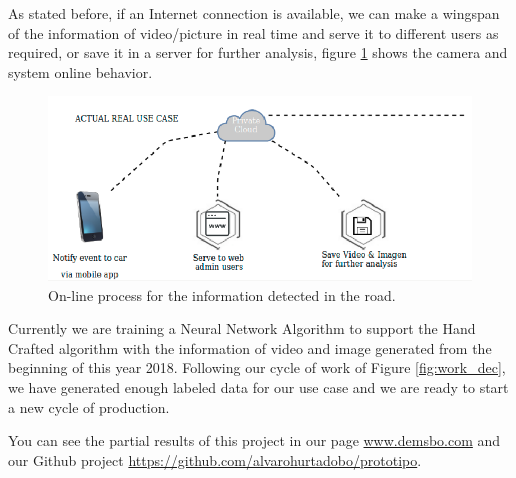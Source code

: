 As stated before, if an Internet connection is available, we can make a wingspan of the information of video/picture in real time and serve it to different users as required, or save it in a server for further analysis, figure \ref{fig:online} shows the camera and system online behavior.


\begin{figure}[t]\centering
	\includegraphics[width=\linewidth]{images/online}
	\caption{On-line process for the information detected in the road. }
	\label{fig:online}
\end{figure}

Currently we are training a Neural Network Algorithm to support the Hand Crafted algorithm with the information of video and image generated from the beginning of this year 2018. Following our cycle of work of Figure \ref{fig:work_dec}, we have generated enough labeled data for our use case and we are ready to start a new cycle of production.

You can see the partial results of this project in our page \href{www.demsbo.com}{www.demsbo.com} and our Github project \href{https://github.com/alvarohurtadobo/prototipo}{https://github.com/alvarohurtadobo/prototipo}.


